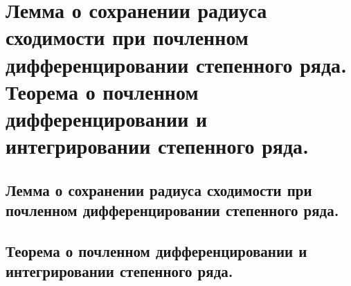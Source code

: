 \section{Лемма о сохранении радиуса сходимости при почленном дифференцировании степенного ряда. Теорема о почленном дифференцировании и интегрировании степенного ряда.}

\subsection{Лемма о сохранении радиуса сходимости при почленном дифференцировании степенного ряда.}

\subsection{Теорема о почленном дифференцировании и интегрировании степенного ряда.}